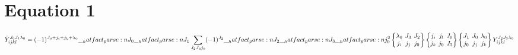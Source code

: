 \documentclass{scrartcl}
\newcommand{\sixj}[6]{\begingroup\setlength{\arraycolsep}{0.2em}\begin{Bmatrix} #1 & #2 & #3 \\ #4 & #5 & #6 \end{Bmatrix}\endgroup}
\begin{document}
\section{Equation 1}
\begin{dmath*}
\bar{Y}_{i j k l}^{{J}_{0} {J}_{1} {{\lambda}}_{0}} = (-1)^{{J}_{0}+{j}_{i}+{j}_{k}+{{\lambda}}_{0}} \* \hatfact{{J}_{0}} \* \hatfact{{J}_{1}} \* \sum_{{J}_{2} {J}_{3} {j}_{0}} \* (-1)^{{J}_{2}} \* \hatfact{{J}_{2}} \* \hatfact{{J}_{3}} \* \hatfact{{j}_{0}^{2}} \* \sixj{{{\lambda}}_{0}}{{J}_{3}}{{J}_{2}}{{j}_{i}}{{j}_{j}}{{j}_{0}} \* \sixj{{j}_{i}}{{j}_{l}}{{J}_{0}}{{j}_{k}}{{j}_{0}}{{J}_{3}} \* \sixj{{J}_{1}}{{J}_{0}}{{{\lambda}}_{0}}{{j}_{0}}{{j}_{j}}{{j}_{k}} \* Y_{i j k l}^{{J}_{2} {J}_{3} {{\lambda}}_{0}}
\end{dmath*}
\end{document}
